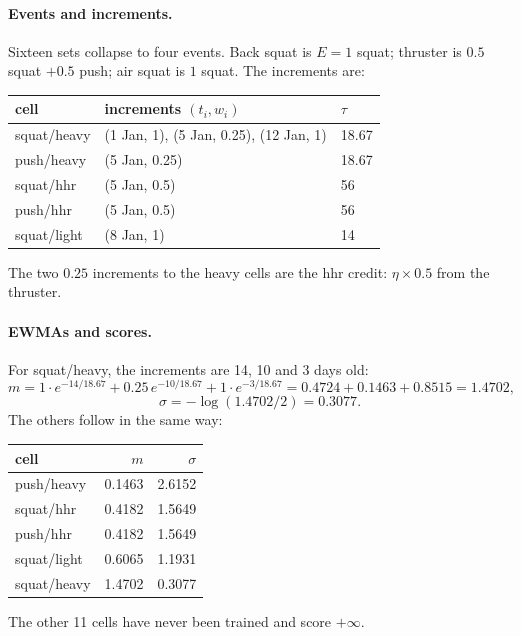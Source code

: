 \documentclass[11pt]{article}
\theoremstyle{plain}
\theoremstyle{definition}
\begin{document}
\paragraph{Events and increments.} Sixteen sets collapse to four events.
Back squat is $E = 1$ squat; thruster is $0.5$ squat $+ 0.5$ push; air
squat is $1$ squat. The increments are:

\begin{center}
\begin{tabular}{lll}
\toprule
cell & increments $(t_i, w_i)$ & $\tau$ \\
\midrule
squat/heavy & (1 Jan, 1), \;(5 Jan, 0.25), \;(12 Jan, 1) & 18.67 \\
push/heavy  & (5 Jan, 0.25) & 18.67 \\
squat/hhr   & (5 Jan, 0.5) & 56 \\
push/hhr    & (5 Jan, 0.5) & 56 \\
squat/light & (8 Jan, 1) & 14 \\
\bottomrule
\end{tabular}
\end{center}

The two $0.25$ increments to the heavy cells are the hhr credit:
$\eta \times 0.5$ from the thruster.

\paragraph{EWMAs and scores.} For squat/heavy, the increments are 14, 10
and 3 days old:
\[
m = 1 \cdot e^{-14/18.67} + 0.25\, e^{-10/18.67} + 1 \cdot e^{-3/18.67}
= 0.4724 + 0.1463 + 0.8515 = 1.4702,
\]
\[
\sigma = -\log(1.4702/2) = 0.3077.
\]
The others follow in the same way:

\begin{center}
\begin{tabular}{lrr}
\toprule
cell & $m$ & $\sigma$ \\
\midrule
push/heavy  & 0.1463 & 2.6152 \\
squat/hhr   & 0.4182 & 1.5649 \\
push/hhr    & 0.4182 & 1.5649 \\
squat/light & 0.6065 & 1.1931 \\
squat/heavy & 1.4702 & 0.3077 \\
\bottomrule
\end{tabular}
\end{center}

The other 11 cells have never been trained and score $+\infty$.
\end{document}
